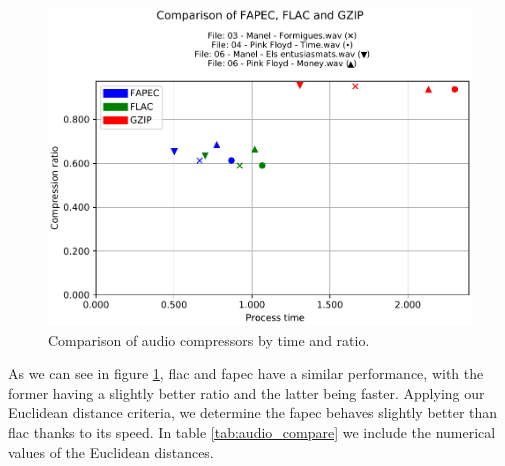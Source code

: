 \begin{figure}[h!]
	\begin{center}
		\includegraphics[scale=0.69]{images/2021-05-30T22:30:32.186296-results_wave.csv_comparison.pdf}
	\end{center}
	\caption{Comparison of audio compressors by time and ratio.}
	\label{fig:audio_compare}
\end{figure}

As we can see in figure \ref{fig:audio_compare}, \acrshort{flac} and \acrshort{fapec} have a similar performance, with the former having a slightly better ratio and the latter being faster. Applying our Euclidean distance criteria, we determine the \acrshort{fapec} behaves slightly better than \acrshort{flac} thanks to its speed. In table \ref{tab:audio_compare} we include the numerical values of the Euclidean distances.


